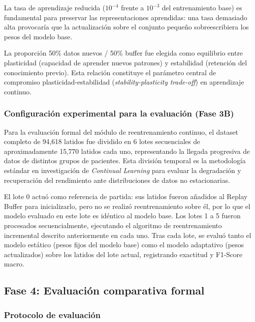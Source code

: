 La tasa de aprendizaje reducida ($10^{-4}$ frente a $10^{-3}$ del entrenamiento base) es fundamental para preservar las representaciones aprendidas: una tasa demasiado alta provocaría que la actualización sobre el conjunto pequeño sobreescribiera los pesos del modelo base.

La proporción 50\% datos nuevos / 50\% buffer fue elegida como equilibrio entre plasticidad (capacidad de aprender nuevos patrones) y estabilidad (retención del conocimiento previo). Esta relación constituye el parámetro central de compromiso plasticidad-estabilidad (\textit{stability-plasticity trade-off}) en aprendizaje continuo.

\subsubsection{Configuración experimental para la evaluación (Fase 3B)}

Para la evaluación formal del módulo de reentrenamiento continuo, el dataset completo de 94,618 latidos fue dividido en 6 lotes secuenciales de aproximadamente 15,770 latidos cada uno, representando la llegada progresiva de datos de distintos grupos de pacientes. Esta división temporal es la metodología estándar en investigación de \textit{Continual Learning} para evaluar la degradación y recuperación del rendimiento ante distribuciones de datos no estacionarias.

El lote 0 actuó como referencia de partida: sus latidos fueron añadidos al Replay Buffer para inicializarlo, pero no se realizó reentrenamiento sobre él, por lo que el modelo evaluado en este lote es idéntico al modelo base. Los lotes 1 a 5 fueron procesados secuencialmente, ejecutando el algoritmo de reentrenamiento incremental descrito anteriormente en cada uno. Tras cada lote, se evaluó tanto el modelo estático (pesos fijos del modelo base) como el modelo adaptativo (pesos actualizados) sobre los latidos del lote actual, registrando exactitud y F1-Score macro.

\subsection{Fase 4: Evaluación comparativa formal}

\subsubsection{Protocolo de evaluación}


